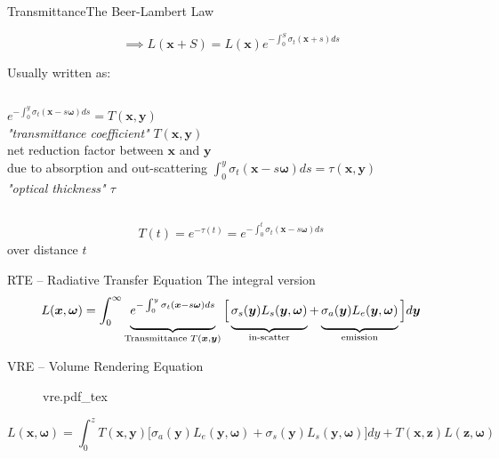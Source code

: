 \documentclass[
  english,            %
  aspectratio=169,    %
]{tumbeamer}
\newcommand\bx[0]{\bm{x}}
\newcommand\by[0]{\bm{y}}
\newcommand\bomega[0]{\bm{\omega}}
\newcommand*\mystrut[1]{\vrule width0pt height0pt depth#1\relax}
\newcommand{\incfig}[1]{%
    \def\svgwidth{\columnwidth}
    {#1.pdf_tex}
}
\begin{document}
\begin{frame}{Transmittance}{The Beer-Lambert Law}
\begin{figure}[ht]
$$ \implies L(\bx + S) = L(\bx)e^{-\int_0^S \sigma_t(\bx+s)ds} $$
\end{figure}

Usually written as:\\
\begin{columns}[t, onlytextwidth]
    $e^{-\int_0^y \sigma_t(\bx-s\bomega)ds} = T(\bx, \by)$
    \\
    \textit{"transmittance coefficient"} $T(\bx, \by)$\\
    net reduction factor between $\bx$ and $\by$ \\due to absorption and
    out-scattering
    $\int_0^y \sigma_t(\bx-s\bomega)ds = \tau(\bx,\by)$\\
    \textit{"optical thickness" $\tau$}
\end{columns}

\vfill
$$ T(t) = e^{-\tau(t)} = e^{-\int_0^t \sigma_t(\bx-s\bomega)ds} $$
    \centering over distance $t$

\end{frame}

\begin{frame}{RTE -- Radiative Transfer Equation}
    {The integral version}
    \vfill
    \vfill
    \begin{equation}
        L(\bx, \bomega) = \int_0^\infty 
        \underbrace{\mystrut{2ex}
            e^{-\int_0^y{\sigma_t(\bx-s\bomega)}ds}
        }_{\text{Transmittance } T(\bx, \by)}
        \Big[
            \underbrace{\mystrut{2ex}
                \sigma_s(\by)L_s(\by, \bomega)
            }_{\text{in-scatter}}
            + 
            \underbrace{\mystrut{2ex}
                \sigma_a(\by)L_e(\by, \bomega)
            }_{\text{emission}}
        \Big]
        d\by
    \end{equation}
    \vfill
\end{frame}

\begin{frame}{VRE -- Volume Rendering Equation}
    \begin{figure}[ht]
        \centering
        \incfig{vre}
        \label{fig:vre}
    \end{figure}
    \begin{equation}
    L(\bx, \bomega) = \int_{0}^{z} 
        T(\bx, \by)
        \big[ 
            \sigma_a(\by)L_e(\by, \bomega) + 
            \sigma_s(\by)L_s(\by, \bomega)
        \big] dy
        + 
        T(\bx, \textbf{z})L(\textbf{z},\bomega)
    \end{equation}
\end{frame}
\end{document}
